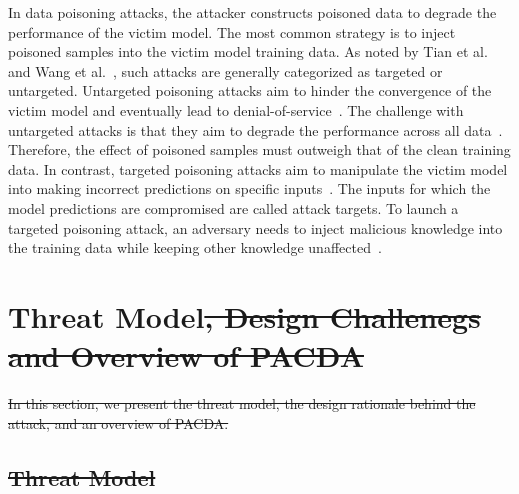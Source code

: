 \documentclass[conference,compsoc]{IEEEtran} %
\providecommand{\DIFdeltex}[1]{{\protect\color{red}\sout{#1}}}                      %
\providecommand{\DIFdelbegin}{} %
\providecommand{\DIFdelend}{} %
\providecommand{\DIFdel}[1]{\texorpdfstring{\DIFdeltex{#1}}{}} %
\newcommand{\DIFscaledelfig}{0.5}
\newlength{\DIFdelgraphicswidth} %
\newlength{\DIFdelgraphicsheight} %
\newcommand{\DIFdelincludegraphics}[2][]{%
\sbox{\DIFdelgraphicsbox}{\DIFOincludegraphics[#1]{#2}}%
\settoboxwidth{\DIFdelgraphicswidth}{\DIFdelgraphicsbox} %
\settoboxtotalheight{\DIFdelgraphicsheight}{\DIFdelgraphicsbox} %
\scalebox{\DIFscaledelfig}{%
\parbox[b]{\DIFdelgraphicswidth}{\usebox{\DIFdelgraphicsbox}\\[-\baselineskip] \rule{\DIFdelgraphicswidth}{0em}}\llap{\resizebox{\DIFdelgraphicswidth}{\DIFdelgraphicsheight}{%
\setlength{\unitlength}{\DIFdelgraphicswidth}%
\begin{picture}(1,1)%
\thicklines\linethickness{2pt} %
{\color[rgb]{1,0,0}\put(0,0){\framebox(1,1){}}}%
{\color[rgb]{1,0,0}\put(0,0){\line( 1,1){1}}}%
{\color[rgb]{1,0,0}\put(0,1){\line(1,-1){1}}}%
\end{picture}%
}\hspace*{3pt}}} %
} %
\DeclareRobustCommand{\DIFdelbegin}{\DIFOdelbegin \let\includegraphics\DIFdelincludegraphics} %
\DeclareRobustCommand{\DIFdelend}{\DIFOaddend \let\includegraphics\DIFOincludegraphics} %
\begin{document}
In data poisoning attacks, the attacker constructs poisoned data to degrade the performance of the victim model.
The most common strategy is to inject poisoned samples into the victim model  training data.
As noted by Tian et al.~\cite{2022-ACM-Computing-Survey-Poisoning-attacks-and-countermeasures-in-ML} and Wang et al.~\cite{2022-ACM-Computing-Survey-Threats-to-training}, such attacks are generally categorized as targeted or untargeted.
Untargeted poisoning attacks aim to hinder the convergence of the victim model and eventually lead to denial-of-service~\cite{pmlr-v20-biggio11,2023-AAAI-yuuntargeted,wang2023analysis}.
The challenge with untargeted attacks is that they aim to degrade the performance across all data~\cite{2024-CCS-Phantom}.
Therefore, the effect of poisoned samples must outweigh that of the clean training data.
In contrast, targeted poisoning attacks aim to manipulate the victim model into making incorrect predictions on specific inputs~\cite{2024-TIFS-Backdoor-Contrastive-Learning,2021-Usenix-Poisoning-Attack-Explanation-guided-Backdoor,2023-SP-backdoor-attack}.
The inputs for which the model  predictions are compromised are called attack targets. 
To launch a targeted poisoning attack, an adversary needs to
inject malicious knowledge into the training data while keeping other knowledge unaffected~\cite{2022-ACM-Computing-Survey-Poisoning-attacks-and-countermeasures-in-ML}.

		
\DIFdelbegin %

\DIFdelend \section{Threat Model\DIFdelbegin \DIFdel{, Design Challenegs and Overview of PACDA}\DIFdelend }
\DIFdelbegin %

\DIFdel{In this section, we present the threat model, the design rationale behind the attack, and an overview of PACDA.
}%

\subsection{\DIFdel{Threat Model}}
\addtocounter{subsection}{-1}%
\DIFdelend \label{Sec: Threat Model}
\end{document}
